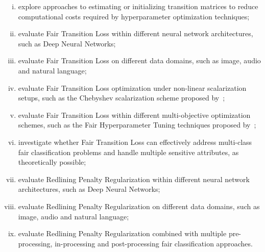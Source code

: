 \begin{enumerate}[(i)]
    \item explore approaches to estimating or initializing transition matrices to reduce computational costs required by hyperparameter optimization techniques;
    \item evaluate Fair Transition Loss within different neural network architectures, such as Deep Neural Networks;
    \item evaluate Fair Transition Loss on different data domains, such as image, audio and natural language;
    \item evaluate Fair Transition Loss optimization under non-linear scalarization setups, such as the Chebyshev scalarization scheme proposed by~\cite{Wei2022};
    \item evaluate Fair Transition Loss within different multi-objective optimization schemes, such as the Fair Hyperparameter Tuning techniques proposed by~\cite{Cruz2021};
    \item investigate whether Fair Transition Loss can effectively address multi-class fair classification problems and handle multiple sensitive attributes, as theoretically possible;
    \item evaluate Redlining Penalty Regularization within different neural network architectures, such as Deep Neural Networks;
    \item evaluate Redlining Penalty Regularization on different data domains, such as image, audio and natural language;
    \item evaluate Redlining Penalty Regularization combined with multiple pre-processing, in-processing and post-processing fair classification approaches.
    
\end{enumerate}

